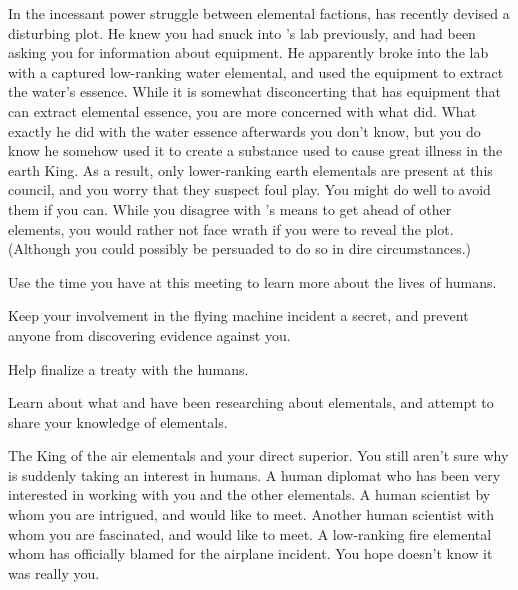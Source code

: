 \documentclass[char]{elementals}
\begin{document}
In the incessant power struggle between elemental factions, \cKing{} has recently devised a disturbing plot.  He knew you had snuck into \cGD{}'s lab previously, and had been asking you for information about  equipment. He apparently broke into the lab with a captured low-ranking water elemental, and used the equipment to extract the water's essence.  While it is somewhat disconcerting that \cGD{} has equipment that can extract elemental essence, you are more concerned with what \cKing{} did.  What exactly he did with the water essence afterwards you don't know, but you do know he somehow used it to create a substance used to cause great illness in the earth King.  As a result, only lower-ranking earth elementals are present at this council, and you worry that they suspect foul play.  You might do well to avoid them if you can.  While you disagree with \cKing{}'s means to get ahead of other elements, you would rather not face \cKing{\their} wrath if you were to reveal the plot.  (Although you could possibly be persuaded to do so in dire circumstances.)

\begin{itemz}[Goals]
  \item Use the time you have at this meeting to learn more about the lives of humans.
  \item Keep your involvement in the flying machine incident a secret, and prevent anyone from discovering evidence against you.
  \item Help \cKing{} finalize a treaty with the humans.
  \item Learn about what \cGD{} and \cScientist{} have been researching about elementals, and attempt to share your knowledge of elementals.  
\end{itemz}

\begin{contacts}
	\contact{\cKing{\intro}} The King of the air elementals and your direct superior.  You still aren't sure why \cKing{\they} is suddenly taking an interest in humans.
  \contact{\cDiplomat{\intro}} A human diplomat who has been very interested in working with you and the other elementals.
  \contact{\cGD{\intro}} A human scientist by whom you are intrigued, and would like to meet.
  \contact{\cScientist{\intro}} Another human scientist with whom you are fascinated, and would like to meet.
  \contact{\cJuliet{\intro}} A low-ranking fire elemental whom \cKing{} has officially blamed for the airplane incident.  You hope \cJuliet{\they} doesn't know it was really you.
\end{contacts} 
\end{document}
